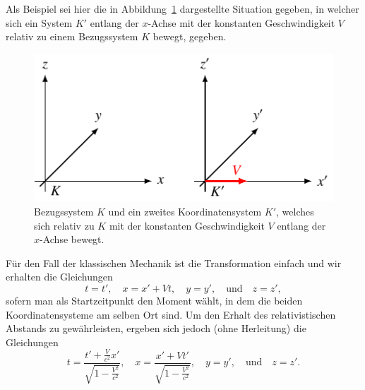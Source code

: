 Als Beispiel sei hier die in Abbildung~\ref{relativ:fig:lorentz-trafo-koords}
dargestellte Situation gegeben, in welcher sich ein System \(K'\)
entlang der \(x\)-Achse mit der konstanten Geschwindigkeit \(V\)
relativ zu einem Bezugssystem \(K\) bewegt, gegeben.
%
\begin{figure}
    \centering
    \includegraphics{papers/relativ/tikz/lorentz-trafo-koord.pdf}
    \caption{Bezugssystem \(K\) und ein zweites Koordinatensystem \(K'\),
    welches sich relativ zu \(K\) mit der konstanten Geschwindigkeit \(V\)
    entlang der \(x\)-Achse bewegt.
    \label{relativ:fig:lorentz-trafo-koords}}
\end{figure}
Für den Fall der klassischen Mechanik ist die Transformation einfach und
wir erhalten die Gleichungen
\begin{equation}
    t = t', \quad
    x = x' + Vt, \quad
    y = y', \quad \text{und} \quad
    z = z',
    \label{relativ:eqn:galilei-trafo-beisp}
\end{equation}
sofern man als Startzeitpunkt den Moment wählt,
in dem die beiden Koordinatensysteme am selben Ort sind.
Um den Erhalt des relativistischen Abstands zu gewährleisten,
ergeben sich jedoch (ohne Herleitung) die Gleichungen
\begin{equation}
    t = \frac{t' + \frac{V}{c^2}x'}{\sqrt{1-\frac{V^2}{c^2}}}, \quad
    x = \frac{x' + V t'}{\sqrt{1 - \frac{V^2}{c^2}}}, \quad
    y = y', \quad \text{und} \quad
    z = z'.
    \label{relativ:eqn:lorentz-trafo-beisp}
\end{equation}

